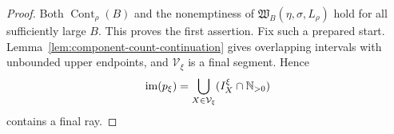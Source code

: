 \begin{proof}
Both $\operatorname{Cont}_\rho(B)$ and the nonemptiness of $\mathfrak W_B(\eta,\sigma,L_\rho)$ hold for all sufficiently large $B$.  This proves the first assertion.  Fix such a prepared start.  Lemma~\ref{lem:component-count-continuation} gives overlapping intervals with unbounded upper endpoints, and $\mathcal V_\xi$ is a final segment.  Hence
\[
\operatorname{im}(p_\xi)
=
\bigcup_{X\in\mathcal V_\xi} (I_X^\xi\cap\mathbb N_{>0})
\]
contains a final ray.
\end{proof}
